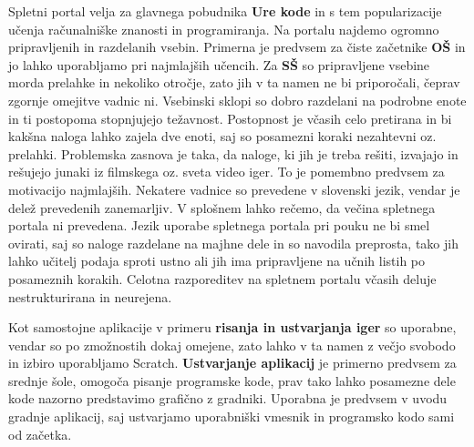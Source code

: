 Spletni portal velja za glavnega pobudnika \textbf{Ure kode} in
s tem popularizacije učenja računalniške znanosti in programiranja. Na
portalu najdemo ogromno pripravljenih in razdelanih vsebin. Primerna
je predvsem za čiste začetnike \textbf{OŠ} in jo lahko uporabljamo pri
najmlajših učencih. Za \textbf{SŠ} so pripravljene vsebine morda
prelahke in nekoliko otročje, zato jih v ta namen ne bi priporočali,
čeprav zgornje omejitve vadnic ni. Vsebinski sklopi so dobro razdelani
na podrobne enote in ti postopoma stopnjujejo težavnost. Postopnost je
včasih celo pretirana in bi kakšna naloga lahko zajela dve enoti, saj
so posamezni koraki nezahtevni oz. prelahki. Problemska zasnova je
taka, da naloge, ki jih je treba rešiti, izvajajo in rešujejo junaki iz
filmskega oz. sveta video iger. To je pomembno predvsem za motivacijo
najmlajših. Nekatere vadnice so prevedene v slovenski jezik, vendar je
delež prevedenih zanemarljiv. V splošnem lahko rečemo, da večina
spletnega portala ni prevedena. Jezik uporabe spletnega portala pri
pouku ne bi smel ovirati, saj so naloge razdelane na majhne dele in so
navodila preprosta, tako jih lahko učitelj podaja sproti ustno ali jih
ima pripravljene na učnih listih po posameznih korakih. Celotna
razporeditev na spletnem portalu včasih deluje nestrukturirana in
neurejena. 

Kot samostojne aplikacije v primeru \textbf{risanja in ustvarjanja
  iger} so uporabne, vendar so po zmožnostih dokaj omejene, zato lahko
v ta namen z večjo svobodo in izbiro uporabljamo
Scratch. \textbf{Ustvarjanje aplikacij} je primerno predvsem za
srednje šole, omogoča pisanje programske kode, prav tako lahko
posamezne dele kode nazorno predstavimo grafično z gradniki. Uporabna
je predvsem v uvodu gradnje aplikacij, saj ustvarjamo uporabniški
vmesnik in programsko kodo sami od začetka.

